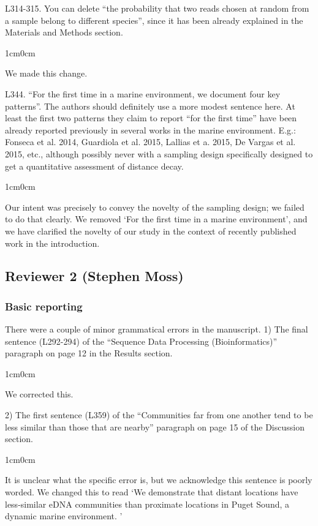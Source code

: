 \documentclass{article}
\newenvironment{response}
	{
	\begin{adjustwidth}{1cm}{0cm}
	\color{peerjBlue}
	}
	{
	\end{adjustwidth}
	}
\begin{document}
L314-315. You can delete ``the probability that two reads chosen at random from a sample belong to different species'', since it has been already explained in the Materials and Methods section.
\begin{response}
  We made this change.\\
\end{response}

L344. ``For the first time in a marine environment, we document four key patterns''. The authors should definitely use a more modest sentence here. At least the first two patterns they claim to report ``for the first time'' have been already reported previously in several works in the marine environment. E.g.: Fonseca et al. 2014, Guardiola et al. 2015, Lallias et a. 2015, De Vargas et al. 2015, etc., although possibly never with a sampling design specifically designed to get a quantitative assessment of distance decay.
\begin{response}
  Our intent was precisely to convey the novelty of the sampling design; we failed to do that clearly.
	We removed `For the first time in a marine environment', and we have clarified the novelty of our study in the context of recently published work in the introduction.\\
\end{response}



\subsection*{Reviewer 2 (Stephen Moss)}
\subsubsection*{Basic reporting}
There were a couple of minor grammatical errors in the manuscript. 1) The final sentence (L292-294) of the ``Sequence Data Processing (Bioinformatics)'' paragraph on page 12 in the Results section.
\begin{response}
  We corrected this.\\
\end{response}

2) The first sentence (L359) of the ``Communities far from one another tend to be less similar than those that are nearby'' paragraph on page 15 of the Discussion section.
\begin{response}
  It is unclear what the specific error is, but we acknowledge this sentence is poorly worded.
	We changed this to read `We demonstrate that distant locations have less-similar eDNA communities than proximate locations in Puget Sound, a dynamic marine environment. '\\
\end{response}
\end{document}
